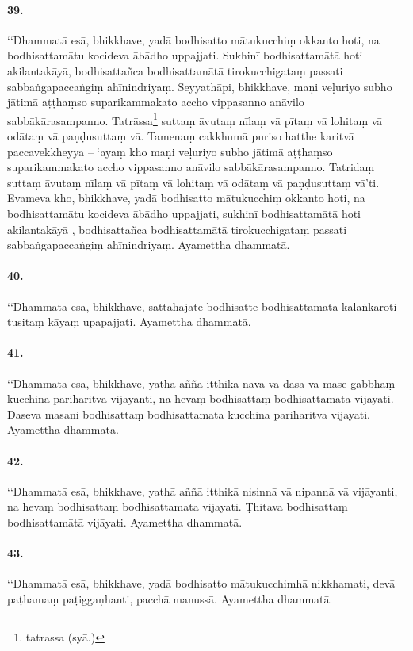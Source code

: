 \paragraph{39.} ‘‘Dhammatā esā, bhikkhave, yadā bodhisatto mātukucchiṃ okkanto hoti, na bodhisattamātu kocideva ābādho uppajjati. Sukhinī bodhisattamātā hoti akilantakāyā, bodhisattañca bodhisattamātā tirokucchigataṃ passati sabbaṅgapaccaṅgiṃ ahīnindriyaṃ. Seyyathāpi, bhikkhave, maṇi veḷuriyo subho jātimā aṭṭhaṃso suparikammakato accho vippasanno anāvilo sabbākārasampanno. Tatrāssa\footnote{tatrassa (syā.)} suttaṃ āvutaṃ nīlaṃ vā pītaṃ vā lohitaṃ vā odātaṃ vā paṇḍusuttaṃ vā. Tamenaṃ cakkhumā puriso hatthe karitvā paccavekkheyya – ‘ayaṃ kho maṇi veḷuriyo subho jātimā aṭṭhaṃso suparikammakato accho vippasanno anāvilo sabbākārasampanno. Tatridaṃ suttaṃ āvutaṃ nīlaṃ vā pītaṃ vā lohitaṃ vā odātaṃ vā paṇḍusuttaṃ vā’ti. Evameva kho, bhikkhave, yadā bodhisatto mātukucchiṃ okkanto hoti, na bodhisattamātu kocideva ābādho uppajjati, sukhinī bodhisattamātā hoti akilantakāyā , bodhisattañca bodhisattamātā tirokucchigataṃ passati sabbaṅgapaccaṅgiṃ ahīnindriyaṃ. Ayamettha dhammatā.

\paragraph{40.} ‘‘Dhammatā esā, bhikkhave, sattāhajāte bodhisatte bodhisattamātā kālaṅkaroti tusitaṃ kāyaṃ upapajjati. Ayamettha dhammatā.

\paragraph{41.} ‘‘Dhammatā esā, bhikkhave, yathā aññā itthikā nava vā dasa vā māse gabbhaṃ kucchinā pariharitvā vijāyanti, na hevaṃ bodhisattaṃ bodhisattamātā vijāyati. Daseva māsāni bodhisattaṃ bodhisattamātā kucchinā pariharitvā vijāyati. Ayamettha dhammatā.

\paragraph{42.} ‘‘Dhammatā esā, bhikkhave, yathā aññā itthikā nisinnā vā nipannā vā vijāyanti, na hevaṃ bodhisattaṃ bodhisattamātā vijāyati. Ṭhitāva bodhisattaṃ bodhisattamātā vijāyati. Ayamettha dhammatā.

\paragraph{43.} ‘‘Dhammatā esā, bhikkhave, yadā bodhisatto mātukucchimhā nikkhamati, devā paṭhamaṃ paṭiggaṇhanti, pacchā manussā. Ayamettha dhammatā.

